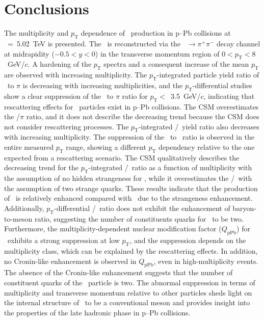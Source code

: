 
\section{Conclusions}
\label{sec:summary}

The multiplicity and $p_{\mathrm{T}}$ dependence of \fzero~production in p--Pb collisions at \snn~=~5.02~TeV is presented. The \fzero~is reconstructed via the \fzero~$\rightarrow\pi^{+}\pi^{-}$ decay channel at midrapidity ($-0.5<y<0$) in the transverse momentum region of $0<p_{\mathrm{T}}<8$~GeV/$c$. A hardening of the $p_{\mathrm{T}}$ spectra and a consequent increase of the mean $p_{\mathrm{T}}$ are observed with increasing multiplicity. The $p_{\mathrm{T}}$-integrated particle yield ratio of \fzero~to $\pi$ is decreasing with increasing multiplicities, and the $p_{\mathrm{T}}$-differential studies show a clear suppression of the \fzero~to $\pi$ ratio for $p_{\mathrm{T}}<$~3.5~GeV/$c$, indicating that rescattering effects for \fzero~particles exist in p--Pb collisions. The CSM overestimates the \fzero/$\pi$ ratio, and it does not describe the decreasing trend because the CSM does not consider rescattering processes. The $p_{\mathrm{T}}$-integrated \fzero/\kstar~yield ratio also decreases with increasing multiplicity. The suppression of the \fzero~to \kstar~ratio is observed in the entire measured $p_{\mathrm{T}}$ range, showing a different $p_{\mathrm{T}}$ dependency relative to the one expected from a rescattering scenario. The CSM qualitatively describes the decreasing trend for the $p_{\mathrm{T}}$-integrated \fzero/\kstar~ratio as a function of multiplicity with the assumption of no hidden strangeness for \fzero, while it overestimates the \fzero/\kstar~with the assumption of two strange quarks. These results indicate that the production of \kstar~is relatively enhanced compared with \fzero~due to the strangeness enhancement. Additionally, $p_{\mathrm{T}}$-differential \fzero/\kstar~ratio does not exhibit the enhancement of baryon-to-meson ratio, suggesting the number of constituents quarks for \fzero~to be two. Furthermore, the multiplicity-dependent nuclear modification factor ($Q_{\mbox{pPb}}$) for \fzero~exhibits a strong suppression at low $p_{\mathrm{T}}$, and the suppression depends on the multiplicity class, which can be explained by the rescattering effects. In addition, no Cronin-like enhancement is observed in $Q_{\mbox{pPb}}$, even in high-multiplicity events. The absence of the Cronin-like enhancement suggests that the number of constituent quarks of the \fzero~particle is two. The abnormal suppression in terms of multiplicity and transverse momentum relative to other particles sheds light on the internal structure of \fzero~to be a conventional meson and provides insight into the properties of the late hadronic phase in p--Pb collisions.
